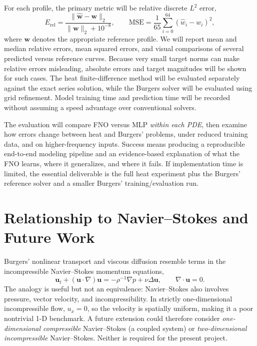 \documentclass{article}
\begin{document}
For each profile, the primary metric will be relative discrete $L^2$ error,
\begin{equation}
 E_{\mathrm{rel}}=\frac{\|\widehat{\boldsymbol w}-\boldsymbol w\|_2}
 {\|\boldsymbol w\|_2+10^{-8}},\qquad
 \mathrm{MSE}=\frac{1}{65}\sum_{i=0}^{64}(\widehat w_i-w_i)^2,
 \label{eq:metrics}
\end{equation}
where $\boldsymbol w$ denotes the appropriate reference profile. We will report mean and median relative errors, mean squared errors, and visual comparisons of several predicted versus reference curves. Because very small target norms can make relative errors misleading, absolute errors and target magnitudes will be shown for such cases. The heat finite-difference method will be evaluated separately against the exact series solution, while the Burgers solver will be evaluated using grid refinement. Model training time and prediction time will be recorded without assuming a speed advantage over conventional solvers.

The evaluation will compare FNO versus MLP \emph{within each PDE}, then examine how errors change between heat and Burgers' problems, under reduced training data, and on higher-frequency inputs. Success means producing a reproducible end-to-end modeling pipeline and an evidence-based explanation of what the FNO learns, where it generalizes, and where it fails. If implementation time is limited, the essential deliverable is the full heat experiment plus the Burgers' reference solver and a smaller Burgers' training/evaluation run.

\section{Relationship to Navier--Stokes and Future Work}
Burgers' nonlinear transport and viscous diffusion resemble terms in the incompressible Navier--Stokes momentum equations,
\begin{equation}
 \boldsymbol u_t+(\boldsymbol u\cdot\nabla)\boldsymbol u
 =-\rho^{-1}\nabla p+\nu\Delta\boldsymbol u,
 \qquad \nabla\cdot\boldsymbol u=0.
 \label{eq:ns}
\end{equation}
The analogy is useful but not an equivalence: Navier--Stokes also involves pressure, vector velocity, and incompressibility. In strictly one-dimensional incompressible flow, $u_x=0$, so the velocity is spatially uniform, making it a poor nontrivial 1-D benchmark. A future extension could therefore consider \emph{one-dimensional compressible} Navier--Stokes (a coupled system) or \emph{two-dimensional incompressible} Navier--Stokes. Neither is required for the present project.
\end{document}
